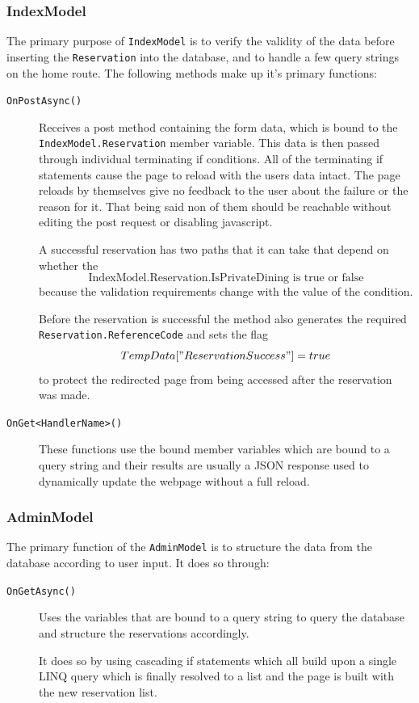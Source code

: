 \documentclass[12pt, a4paper]{article}
\begin{document}
\subsubsection{IndexModel}
The primary purpose of \texttt{IndexModel} is to verify the validity of the data before inserting the \texttt{Reservation} into the database, and to handle a few query strings on the home route. The following methods make up it's primary functions:
\begin{description}
    \item[\texttt{OnPostAsync()}] Receives a post method containing the form data, which is bound to the \texttt{IndexModel.Reservation} member variable. This data is then passed through individual terminating if conditions. All of the terminating if statements cause the page to reload with the users data intact. The page reloads by themselves give no feedback to the user about the failure or the reason for it. That being said non of them should be reachable without editing the post request or disabling javascript.
    
    A successful reservation has two paths that it can take that depend on whether the \[\text{IndexModel.Reservation.IsPrivateDining is true or false}\] because the validation requirements change with the value of the condition.

    Before the reservation is successful the method also generates the required \texttt{Reservation.ReferenceCode} and sets the flag \[TempData["ReservationSuccess"]=true\] to protect the redirected page from being accessed after the reservation was made. 

    \item[\texttt{OnGet<HandlerName>()}] These functions use the bound member variables which are bound to a query string and their results are usually a JSON response used to dynamically update the webpage without a full reload.
\end{description}

\subsubsection{AdminModel}
The primary function of the \texttt{AdminModel} is to structure the data from the database according to user input. It does so through:
\begin{description}
    \item[\texttt{OnGetAsync()}] Uses the variables that are bound to a query string to query the database and structure the reservations accordingly.
    
    It does so by using cascading if statements which all build upon a single LINQ query which is finally resolved to a list and the page is built with the new reservation list.
\end{description}
\end{document}
